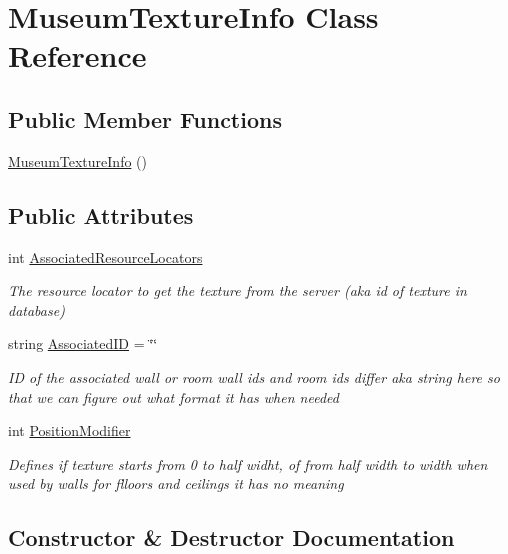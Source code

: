 \hypertarget{class_museum_texture_info}{}\section{Museum\+Texture\+Info Class Reference}
\label{class_museum_texture_info}
\subsection*{Public Member Functions}
\begin{DoxyCompactItemize}
\item 
\mbox{\hyperlink{class_museum_texture_info_a930fdf9cdf96752c649660bed901178f}{Museum\+Texture\+Info}} ()
\end{DoxyCompactItemize}
\subsection*{Public Attributes}
\begin{DoxyCompactItemize}
\item 
int \mbox{\hyperlink{class_museum_texture_info_a5b0c9f041422a931cab7b3de689fe44e}{Associated\+Resource\+Locators}}
\begin{DoxyCompactList}\small\item\em The resource locator to get the texture from the server (aka id of texture in database) \end{DoxyCompactList}\item 
string \mbox{\hyperlink{class_museum_texture_info_a31425831c498a46842b2cce06e629183}{Associated\+ID}} = \char`\"{}\char`\"{}
\begin{DoxyCompactList}\small\item\em ID of the associated wall or room wall ids and room ids differ aka string here so that we can figure out what format it has when needed \end{DoxyCompactList}\item 
int \mbox{\hyperlink{class_museum_texture_info_aaa15a48a616e6212ead2dd506f452974}{Position\+Modifier}}
\begin{DoxyCompactList}\small\item\em Defines if texture starts from 0 to half widht, of from half width to width when used by walls for flloors and ceilings it has no meaning \end{DoxyCompactList}\end{DoxyCompactItemize}


\subsection{Constructor \& Destructor Documentation}
\mbox{\label{class_museum_texture_info_a930fdf9cdf96752c649660bed901178f}} 
